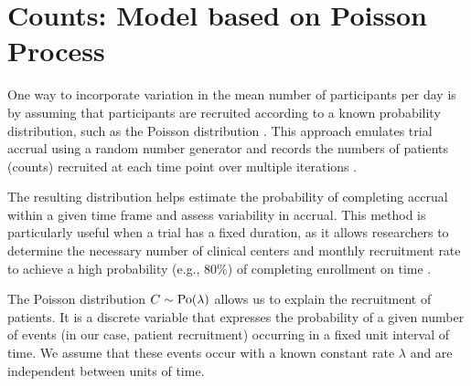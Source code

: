 \begin{table}[h!]
\centering
{}
\caption{Moments and aleatory and epistemic uncertainty in accrual until $t$ covered by different models for counts.}
\label{tab:count_modeling_2}
\end{table}


\section{Counts: Model based on Poisson Process}

One way to incorporate variation in the mean number of participants per day is by assuming that participants are recruited according to a known probability distribution, such as the Poisson distribution \citep{carter2004application}. This approach emulates trial accrual using a random number generator and records the numbers of patients (counts) recruited at each time point over multiple iterations \citep{carter2005practical}. 

The resulting distribution helps estimate the probability of completing accrual within a given time frame and assess variability in accrual. This method is particularly useful when a trial has a fixed duration, as it allows researchers to determine the necessary number of clinical centers and monthly recruitment rate to achieve a high probability (e.g., 80\%) of completing enrollment on time \citep{carter2005practical}.

The Poisson distribution $C\sim \rm{Po} (\lambda)$ allows us to explain the recruitment of patients. It is a discrete variable that expresses the probability of a given number of events (in our case, patient recruitment) occurring in a fixed unit interval of time. We assume that these events occur with a known constant rate $\lambda$ and are independent between units of time.

